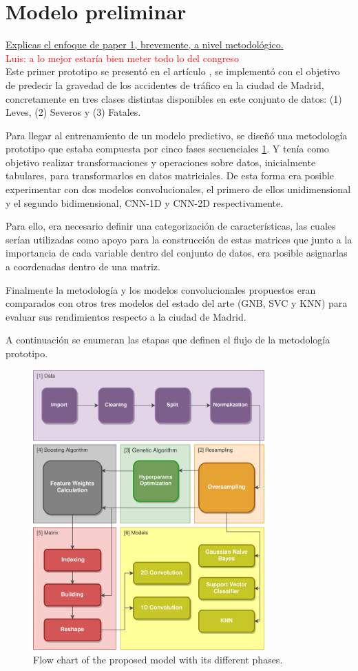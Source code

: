 \documentclass{uathesis-es}
\begin{document}
\section{Modelo preliminar}

\underline{Explicas el enfoque de paper 1, brevemente, a nivel metodológico.}\\
\textcolor{red}{Luis: a lo mejor estaría bien meter todo lo del congreso}\\

Este primer prototipo se presentó en el artículo \cite{PEREZSALA2023113245}, se implementó con el objetivo de predecir la gravedad de los accidentes de tráfico en la ciudad de Madrid, concretamente en tres clases distintas disponibles en este conjunto de datos: (1) Leves, (2) Severos y (3) Fatales.

Para llegar al entrenamiento de un modelo predictivo, se diseñó una metodología prototipo que estaba compuesta por cinco fases secuenciales \ref{figDegree}. Y tenía como objetivo  realizar transformaciones y operaciones sobre datos, inicialmente tabulares, para transformarlos en datos matriciales. De esta forma era posible experimentar con dos modelos convolucionales, el primero de ellos unidimensional y el segundo bidimensional, CNN-1D y CNN-2D respectivamente.

Para ello, era necesario definir una categorización de características, las cuales serían utilizadas como apoyo para la construcción de estas matrices que junto a la importancia de cada variable dentro del conjunto de datos, era posible asignarlas a coordenadas dentro de una matriz.

Finalmente la metodología y los modelos convolucionales propuestos eran comparados con otros tres modelos del estado del arte (GNB, SVC y KNN) para evaluar sus rendimientos respecto a la ciudad de Madrid.

A continuación se enumeran las etapas que definen el flujo de la metodología prototipo.

\begin{figure}[H]
    \centering
    \includegraphics[width=3.5in]{Figures/1stPaper/Data_flow.png}
    \caption{Flow chart of the proposed model with its different phases.}
    \label{figDegree}
\end{figure}
\end{document}
